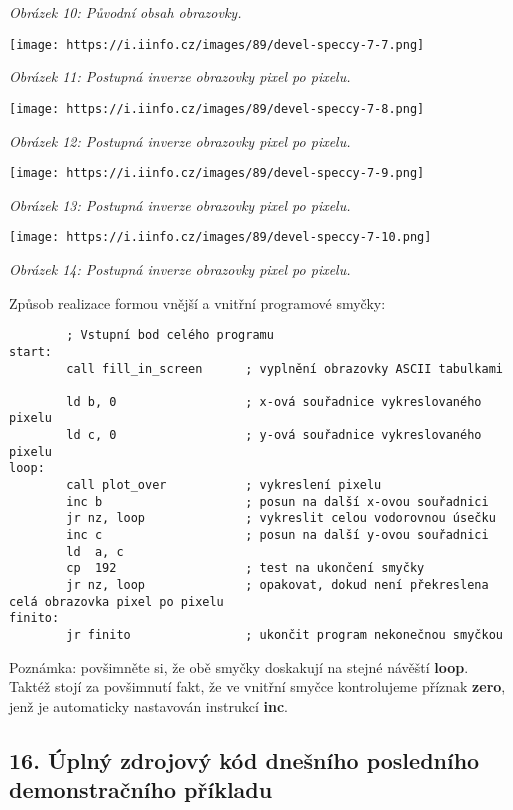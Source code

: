 \documentclass{article}
\renewcommand\includegraphics[2][]{}
\begin{document}
\emph{Obrázek 10: Původní obsah obrazovky.}

\texttt{[image: https://i.iinfo.cz/images/89/devel-speccy-7-7.png]}

\emph{Obrázek 11: Postupná inverze obrazovky pixel po pixelu.}

\texttt{[image: https://i.iinfo.cz/images/89/devel-speccy-7-8.png]}

\emph{Obrázek 12: Postupná inverze obrazovky pixel po pixelu.}

\texttt{[image: https://i.iinfo.cz/images/89/devel-speccy-7-9.png]}

\emph{Obrázek 13: Postupná inverze obrazovky pixel po pixelu.}

\texttt{[image: https://i.iinfo.cz/images/89/devel-speccy-7-10.png]}

\emph{Obrázek 14: Postupná inverze obrazovky pixel po pixelu.}

Způsob realizace formou vnější a vnitřní programové smyčky:

\begin{verbatim}
        ; Vstupní bod celého programu
start:
        call fill_in_screen      ; vyplnění obrazovky ASCII tabulkami
 
        ld b, 0                  ; x-ová souřadnice vykreslovaného pixelu
        ld c, 0                  ; y-ová souřadnice vykreslovaného pixelu
loop:
        call plot_over           ; vykreslení pixelu
        inc b                    ; posun na další x-ovou souřadnici
        jr nz, loop              ; vykreslit celou vodorovnou úsečku
        inc c                    ; posun na další y-ovou souřadnici
        ld  a, c
        cp  192                  ; test na ukončení smyčky
        jr nz, loop              ; opakovat, dokud není překreslena celá obrazovka pixel po pixelu
finito:
        jr finito                ; ukončit program nekonečnou smyčkou
\end{verbatim}

Poznámka: povšimněte si, že obě smyčky doskakují na stejné návěští
\textbf{loop}. Taktéž stojí za povšimnutí fakt, že ve vnitřní smyčce
kontrolujeme příznak \textbf{zero}, jenž je automaticky nastavován
instrukcí \textbf{inc}.

\hypertarget{k16}{%
\subsection{16. Úplný zdrojový kód dnešního posledního demonstračního
příkladu}\label{k16}}
\end{document}
